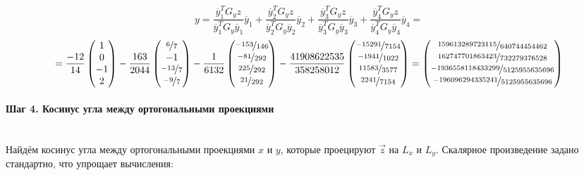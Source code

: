 \documentclass{article}
\begin{document}
$$y = \frac{\overline{y}_1^TG_yz}{\overline{y}_1^TG_y\overline{y}_1}\overline{y}_1 + \frac{\overline{y}_2^TG_yz}{\overline{y}_2^TG_y\overline{y}_2}\overline{y}_2 + \frac{\overline{y}_3^TG_yz}{\overline{y}_3^TG_y\overline{y}_3}\overline{y}_3 + \frac{\overline{y}_4^TG_yz}{\overline{y}_4^TG_y\overline{y}_4}\overline{y}_4 = $$
$$= \frac{-12}{14}\begin{pmatrix}
        1 \\ 0 \\ -1 \\ 2
    \end{pmatrix} - \frac{163}{2044}\begin{pmatrix}
        \nicefrac{6}{7} \\ -1 \\ \nicefrac{-13}{7} \\ \nicefrac{-9}{7}
    \end{pmatrix} - \frac{1}{6132}\begin{pmatrix}
        \nicefrac{-153}{146} \\ \nicefrac{-81}{292} \\ \nicefrac{225}{292} \\ \nicefrac{21}{292}
    \end{pmatrix} - \frac{41908622535}{358258012}\begin{pmatrix}
        \nicefrac{-15291}{7154} \\ \nicefrac{-1941}{1022}  \\ \nicefrac{11583}{3577}  \\ \nicefrac{2241}{7154}
    \end{pmatrix} = \begin{pmatrix}
        \nicefrac{159613289723115}{640744454462} \\
        \nicefrac{162747701863423}{732279376528} \\
        \nicefrac{-1936558118433299}{5125955635696} \\
        \nicefrac{-196096294335241}{5125955635696}
    \end{pmatrix}$$

\paragraph*{Шаг 4. Коcинус угла между ортогональными проекциями} \, \\
Найдём косинус угла между ортогональными проекциями $x$ и $y$, которые проецируют $\vec{z}$ на $L_x$ и $L_y$. Скалярное произведение задано стандартно, что упрощает вычисления:
\end{document}
